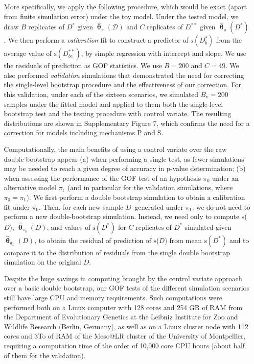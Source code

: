 \documentclass[a4paper]{article}\usepackage[]{graphicx}\usepackage[]{color}
\newcommand{\adata}{\ensuremath{\mathcal{D}}}
\newcommand{\data}{\ensuremath{D}}
\newcommand{\datab}{\ensuremath{D_{b}^*}}
\newcommand{\databb}{\ensuremath{D_{bc}^{**}}}
\newcommand{\sfn}{\ensuremath{\mathrm{s}}}
\newcommand{\bth}{\ensuremath{\bm{\uptheta}}}
\begin{document}
More specifically, we apply the following procedure, which would be exact (apart from finite simulation error) under the toy model. Under the tested model, we draw $B$ replicates of $\data^*$ given $\hat{\bth}_\pi(\adata)$ and $C$ replicates of $\data^{**}$ given $\hat{\bth}_\pi(\data^*)$. We then perform a \emph{calibration} fit to construct a predictor of $\sfn(\datab)$ from the average value of $\sfn(\databb)$, by simple regression with intercept and slope. We use the residuals of prediction as GOF statistics. We use $B=200$ and $C=49$. We also performed \emph{validation} simulations that demonstrated the need for correcting the single-level bootstrap procedure and the effectiveness of our correction. For this validation, under each of the sixteen scenarios, we simulated $B_{\mathrm{v}}=200$ samples under the fitted model and applied to them both the single-level bootstrap test and the testing procedure with control variate. The resulting distributions are shown in Supplementary Figure 7, which confirms the need for a correction for models including mechanisms P and S.

Computationally, the main benefits of using a control variate over the raw double-bootstrap appear (a) when performing a single test, as fewer simulations may be needed to reach a given degree of accuracy in p-value determination; (b) when assessing the performance of the GOF test of an hypothesis $\pi_0$ under an alternative model $\pi_1$ (and in particular for the validation simulations, where $\pi_0 = \pi_1$). We first perform a double bootstrap simulation to obtain a calibration fit under $\pi_0$. Then, for each new sample \data\ generated under $\pi_1$, we do not need to perform a new double-bootstrap simulation. Instead, we need only to compute \sfn(\data), $\hat{\bth}_{\pi_0}(\data)$, and values of $\sfn(\data^*)$ for $C$ replicates of $\data^*$ simulated given $\hat{\bth}_{\pi_0}(\data)$, to obtain the residual of prediction of \sfn(\data)  from mean $\sfn(\data^*)$ and to compare it to the distribution of residuals from the single double bootstrap simulation on the original \data.

Despite the huge savings in computing brought by the control variate approach over a basic double bootstrap, our GOF tests of the different simulation scenarios still have large CPU and memory requirements. Such computations were performed both on a Linux computer with 128 cores and 254 GB of RAM from the Department of Evolutionary Genetics at the Leibniz Institute for Zoo and Wildlife Research (Berlin, Germany), as well as on a Linux cluster node with 112 cores and 3To of RAM of the Meso@LR cluster of the University of Montpellier, requiring a computation time of the order of 10,000 core CPU hours (about half of them for the validation).
\end{document}
